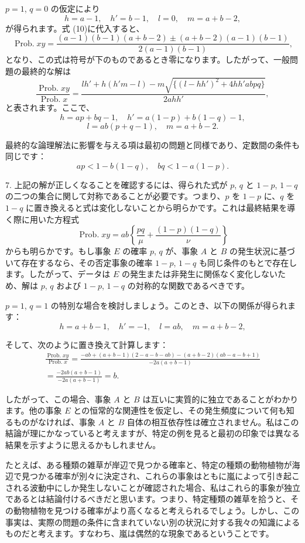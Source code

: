 \documentclass[a4paper,11pt,openany]{ltjsbook}
\begin{document}
$p = 1$, $q = 0$ の仮定により
\[
h = a - 1, \quad h' = b - 1, \quad l = 0, \quad m = a + b - 2,
\]
が得られます。式 (10)に代入すると、
\[
\operatorname{Prob.} xy = \frac{(a-1)(b-1)(a+b-2) \pm (a+b-2)(a-1)(b-1)}{2(a-1)(b-1)},
\]
となり、この式は符号が下のものであるとき零になります。したがって、一般問題の最終的な解は
\[
\frac{\operatorname{Prob.} xy}{\operatorname{Prob.} x}
= \frac{lh' + h(h'm - l) - m \sqrt{\{(l - hh')^2 + 4hh'abpq\}}}{2ahh'},
\]
と表されます。ここで、
\[
h = ap + bq - 1, \quad h' = a(1-p) + b(1-q) - 1,
\]
\[
l = ab(p + q - 1), \quad m = a + b - 2.
\]

最終的な論理解法に影響を与える項は最初の問題と同様であり、定数間の条件も同じです：
\[
ap < 1 - b(1-q), \quad bq < 1 - a(1-p).
\]

7. 上記の解が正しくなることを確認するには、得られた式が $p$, $q$ と $1 - p$, $1 - q$ の二つの集合に関して対称であることが必要です。つまり、$p$ を $1 - p$ に、$q$ を $1 - q$ に置き換えると式は変化しないことから明らかです。これは最終結果を導く際に用いた方程式
\[
\operatorname{Prob.} xy = ab \left\{ \frac{pq}{\mu} + \frac{(1-p)(1-q)}{\nu} \right\}
\]
からも明らかです。もし事象 $E$ の確率 $p$, $q$ が、事象 $A$ と $B$ の発生状況に基づいて存在するなら、その否定事象の確率 $1 - p$, $1 - q$ も同じ条件のもとで存在します。したがって、データは $E$ の発生または非発生に関係なく変化しないため、解は $p$, $q$ および $1 - p$, $1 - q$ の対称的な関数であるべきです。

$p = 1$, $q = 1$ の特別な場合を検討しましょう。このとき、以下の関係が得られます：
\begin{equation*}
h = a + b - 1, \quad h' = -1, \quad l = ab, \quad m = a + b - 2,
\end{equation*}

そして、次のように置き換えて計算します：
\begin{gather*}
\frac{\operatorname{Prob. } xy}{\operatorname{Prob. } x} 
= \frac{-ab + (a+b-1)(2-a-b-ab)-(a+b-2)(ab-a-b+1)}{-2a(a+b-1)} \\
= \frac{-2ab(a+b-1)}{-2a(a+b-1)} = b.
\end{gather*}

したがって、この場合、事象 $A$ と $B$ は互いに実質的に独立であることがわかります。他の事象 $E$ との恒常的な関連性を仮定し、その発生頻度について何も知るものがなければ、事象 $A$ と $B$ 自体の相互依存性は確立されません。私はこの結論が理にかなっていると考えますが、特定の例を見ると最初の印象では異なる結果を示すように思えるかもしれません。

たとえば、ある種類の雑草が岸辺で見つかる確率と、特定の種類の動物植物が海辺で見つかる確率が別々に決定され、これらの事象はともに嵐によって引き起こされる波動中にしか発生しないことが確認された場合、私はこれら的事象が独立であるとは結論付けるべきだと思います。つまり、特定種類の雑草を拾うと、その動物植物を見つける確率がより高くなると考えられるでしょう。しかし、この事実は、実際の問題の条件に含まれていない別の状況に対する我々の知識によるものだと考えます。すなわち、嵐は偶然的な現象であるということです。
\end{document}
